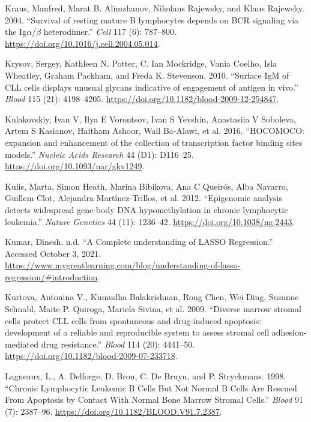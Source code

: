 \documentclass[11pt, a4paper, twosided]{book}
\newenvironment{CSLReferences}%
  {}%
  {\par}
\begin{document}
\begin{CSLReferences}{1}{0}
\leavevmode{}%
Kraus, Manfred, Marat B. Alimzhanov, Nikolaus Rajewsky, and Klaus Rajewsky. 2004. {``{Survival of resting mature B lymphocytes depends on BCR signaling via the Ig\(\alpha\)/\(\beta\) heterodimer}.''} \emph{Cell} 117 (6): 787--800. \url{https://doi.org/10.1016/j.cell.2004.05.014}.

\leavevmode{}%
Krysov, Sergey, Kathleen N. Potter, C. Ian Mockridge, Vania Coelho, Isla Wheatley, Graham Packham, and Freda K. Stevenson. 2010. {``{Surface IgM of CLL cells displays unusual glycans indicative of engagement of antigen in vivo}.''} \emph{Blood} 115 (21): 4198--4205. \url{https://doi.org/10.1182/blood-2009-12-254847}.

\leavevmode{}%
Kulakovskiy, Ivan V, Ilya E Vorontsov, Ivan S Yevshin, Anastasiia V Soboleva, Artem S Kasianov, Haitham Ashoor, Wail Ba-Alawi, et al. 2016. {``{HOCOMOCO: expansion and enhancement of the collection of transcription factor binding sites models.}''} \emph{Nucleic Acids Research} 44 (D1): D116--25. \url{https://doi.org/10.1093/nar/gkv1249}.

\leavevmode{}%
Kulis, Marta, Simon Heath, Marina Bibikova, Ana C Queirós, Alba Navarro, Guillem Clot, Alejandra Martínez-Trillos, et al. 2012. {``{Epigenomic analysis detects widespread gene-body DNA hypomethylation in chronic lymphocytic leukemia}.''} \emph{Nature Genetics} 44 (11): 1236--42. \url{https://doi.org/10.1038/ng.2443}.

\leavevmode{}%
Kumar, Dinesh. n.d. {``{A Complete understanding of LASSO Regression}.''} Accessed October 3, 2021. \url{https://www.mygreatlearning.com/blog/understanding-of-lasso-regression/\#introduction}.

\leavevmode{}%
Kurtova, Antonina V., Kumudha Balakrishnan, Rong Chen, Wei Ding, Susanne Schnabl, Maite P. Quiroga, Mariela Sivina, et al. 2009. {``{Diverse marrow stromal cells protect CLL cells from spontaneous and drug-induced apoptosis: development of a reliable and reproducible system to assess stromal cell adhesion-mediated drug resistance}.''} \emph{Blood} 114 (20): 4441--50. \url{https://doi.org/10.1182/blood-2009-07-233718}.

\leavevmode{}%
Lagneaux, L., A. Delforge, D. Bron, C. De Bruyn, and P. Stryckmans. 1998. {``{Chronic Lymphocytic Leukemic B Cells But Not Normal B Cells Are Rescued From Apoptosis by Contact With Normal Bone Marrow Stromal Cells}.''} \emph{Blood} 91 (7): 2387--96. \url{https://doi.org/10.1182/BLOOD.V91.7.2387}.


\end{CSLReferences}
\end{document}
